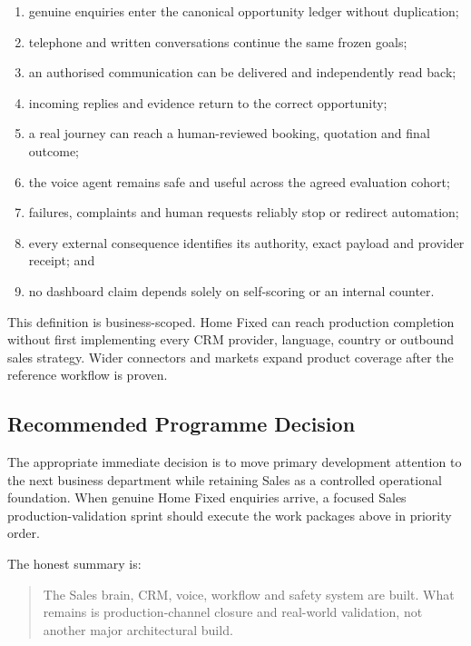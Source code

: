 \begin{enumerate}[leftmargin=*]
  \item genuine enquiries enter the canonical opportunity ledger without duplication;
  \item telephone and written conversations continue the same frozen goals;
  \item an authorised communication can be delivered and independently read back;
  \item incoming replies and evidence return to the correct opportunity;
  \item a real journey can reach a human-reviewed booking, quotation and final outcome;
  \item the voice agent remains safe and useful across the agreed evaluation cohort;
  \item failures, complaints and human requests reliably stop or redirect automation;
  \item every external consequence identifies its authority, exact payload and provider receipt; and
  \item no dashboard claim depends solely on self-scoring or an internal counter.
\end{enumerate}

This definition is business-scoped.  Home Fixed can reach production completion
without first implementing every CRM provider, language, country or outbound
sales strategy.  Wider connectors and markets expand product coverage after the
reference workflow is proven.

\subsection{Recommended Programme Decision}

The appropriate immediate decision is to move primary development attention to
the next business department while retaining Sales as a controlled operational
foundation.  When genuine Home Fixed enquiries arrive, a focused Sales
production-validation sprint should execute the work packages above in priority
order.

The honest summary is:

\begin{quote}
The Sales brain, CRM, voice, workflow and safety system are built.  What remains
is production-channel closure and real-world validation, not another major
architectural build.
\end{quote}
